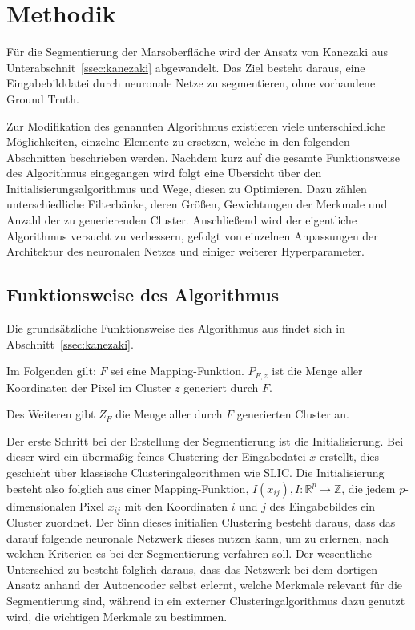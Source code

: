 \chapter{Methodik}
\label{chap:methodik}

Für die Segmentierung der Marsoberfläche wird der Ansatz von Kanezaki \etal \cite{kanezaki_18} aus Unterabschnit~\ref{ssec:kanezaki} abgewandelt. Das Ziel besteht daraus, eine Eingabebilddatei durch neuronale Netze zu segmentieren, ohne vorhandene Ground Truth.

Zur Modifikation des genannten Algorithmus existieren viele unterschiedliche Möglichkeiten, einzelne Elemente zu ersetzen, welche in den folgenden Abschnitten beschrieben werden. Nachdem kurz auf die gesamte Funktionsweise des Algorithmus eingegangen wird folgt eine Übersicht über den Initialisierungsalgorithmus und Wege, diesen zu Optimieren. Dazu zählen \bspw unterschiedliche Filterbänke, deren Größen, Gewichtungen der Merkmale und Anzahl der zu generierenden Cluster. Anschließend wird der eigentliche Algorithmus versucht zu verbessern, gefolgt von einzelnen Anpassungen der Architektur des neuronalen Netzes und einiger weiterer Hyperparameter.

\section{Funktionsweise des Algorithmus}
\label{sec:howitworks}

Die grundsätzliche Funktionsweise des Algorithmus aus \cite{kanezaki_18} findet sich in Abschnitt~\ref{ssec:kanezaki}. 

Im Folgenden gilt: $F$ sei eine Mapping-Funktion. $P_{F,z}$ ist die Menge aller Koordinaten der Pixel im Cluster $z$ generiert durch $F$.

Des Weiteren gibt $Z_F$ die Menge aller durch $F$ generierten Cluster an.

Der erste Schritt bei der Erstellung der Segmentierung ist die Initialisierung. Bei dieser wird ein übermäßig feines Clustering der Eingabedatei $x$ erstellt, dies geschieht über klassische Clusteringalgorithmen wie SLIC. Die Initialisierung besteht also folglich aus einer Mapping-Funktion, $I(x_{ij}), I: \mathbb{R}^p\rightarrow\mathbb{Z}$, die jedem $p$-dimensionalen Pixel $x_{ij}$ mit den Koordinaten $i$ und $j$ des Eingabebildes ein Cluster zuordnet. Der Sinn dieses initialien Clustering besteht daraus, dass das darauf folgende neuronale Netzwerk dieses nutzen kann, um zu erlernen, nach welchen Kriterien es bei der Segmentierung verfahren soll. Der wesentliche Unterschied zu \cite{junyuan_16} besteht folglich daraus, dass das Netzwerk bei dem dortigen Ansatz anhand der Autoencoder selbst erlernt, welche Merkmale relevant für die Segmentierung sind, während in \cite{kanezaki_18} ein externer Clusteringalgorithmus dazu genutzt wird, die wichtigen Merkmale zu bestimmen.


